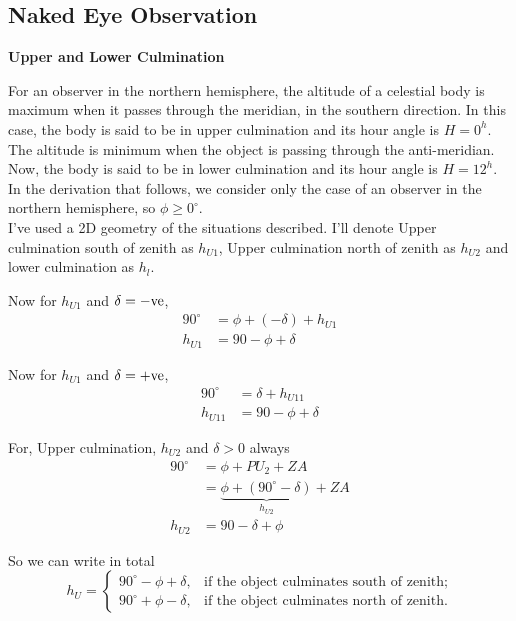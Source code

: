 \documentclass[a4paper,12pt]{extarticle}
\begin{document}
\subsection{Naked Eye Observation}

\textsf{\textbf{Upper and Lower Culmination}}

For an observer in the northern hemisphere, the altitude of a celestial body is maximum when it passes through the meridian, in the southern direction. In this case, the body is said to be in upper culmination and its hour angle is $H= 0^h$. The altitude is minimum when the object is passing through the anti-meridian. Now, the body is said to be in lower culmination and its hour angle is $H = 12^h$. In the derivation that follows, we consider only the case of an observer in the
northern hemisphere, so $\phi \geq 0^\circ$.\\

I've used a 2D geometry of the situations described. I'll denote Upper culmination south of zenith as $h_{U1}$, Upper culmination north of zenith as $h_{U2}$ and lower culmination as $h_l$.
\begin{multicols}{2}
Now for $h_{U1}$ and $\delta=-\rm ve$,
\begin{align*}
	90^\circ &=\phi+ (-\delta)+ h_{U1}\\
	h_{U1} &= 90-\phi+\delta 
\end{align*} 

Now for $h_{U1}$ and $\delta=+\rm ve$,
\begin{align*}
	90^\circ &=\delta+ h_{U11}\\
	h_{U11} &= 90-\phi+\delta 
\end{align*} 
\end{multicols}
For, Upper culmination, $h_{U2}$ and $\delta>0$ always
\begin{align*}
	90^\circ &= \phi +PU_2+ZA\\
	&= \underbrace{\phi+ (90^\circ-\delta)}_{h_{U2}}+ZA\\
	h_{U2} &=90-\delta +\phi
\end{align*}

So we can write in total 
\begin{equation}
	\boxed{h_U =\begin{cases}
			90^\circ - \phi + \delta, & \text{if the object culminates south of zenith;} \\
			90^\circ + \phi - \delta, & \text{if the object culminates north of zenith.}
	\end{cases}}
\end{equation}
\end{document}

